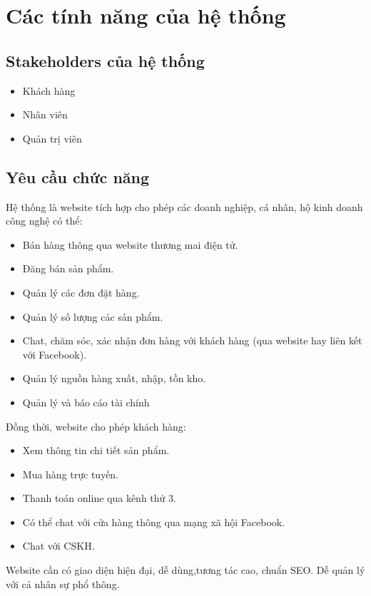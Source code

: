 \section{Các tính năng của hệ thống}
\subsection{Stakeholders của hệ thống}
\begin{itemize}
    \item Khách hàng
    \item Nhân viên
    \item Quản trị viên
\end{itemize}
\subsection{Yêu cầu chức năng}
\par Hệ thống là website tích hợp cho phép các doanh nghiệp, cá nhân, hộ kinh doanh công nghệ có thể: 
\begin{itemize}
    \item Bán hàng thông qua website thương mai điện tử.
    \item Đăng bán sản phẩm. 
    \item Quản lý các đơn đặt hàng.
    \item Quản lý số lượng các sản phẩm.
    \item Chat, chăm sóc, xác nhận đơn hàng với khách hàng (qua website hay liên kết với Facebook).
    \item Quản lý nguồn hàng xuất, nhập, tồn kho.
    \item Quản lý và báo cáo tài chính
  \end{itemize}
Đồng thời, website cho phép khách hàng:
  \begin{itemize}
    \item Xem thông tin chi tiết sản phẩm.
    \item Mua hàng trực tuyến.
    \item Thanh toán online qua kênh thứ 3.
    \item Có thể chat với cửa hàng thông qua mạng xã hội Facebook.
    \item Chat với CSKH.
  \end{itemize}
Website cần có giao diện hiện đại, dễ dùng,tương tác cao, chuẩn SEO. Dễ quản lý với cả nhân sự phổ thông.
